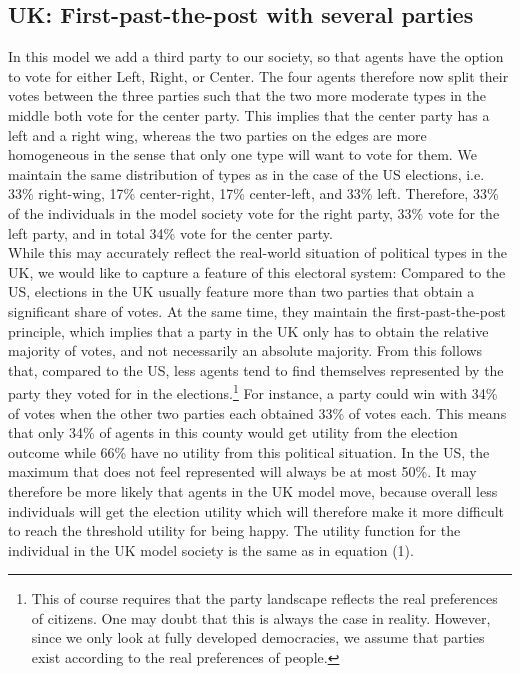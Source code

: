 \documentclass[12pt, a4paper]{article}
\begin{document}
	\subsection{UK: First-past-the-post with several parties}
	In this model we add a third party to our society, so that agents have the option to vote for either Left, Right, or Center. The four agents therefore now split their votes between the three parties such that the two more moderate types in the middle both vote for the center party. This implies that the center party has a left and a right wing, whereas the two parties on the edges are more homogeneous in the sense that only one type will want to vote for them. We maintain the same distribution of types as in the case of the US elections, i.e. 33\% right-wing, 17\% center-right, 17\% center-left, and 33\% left. Therefore, 33\% of the individuals in the model society vote for the right party, 33\% vote for the left party, and in total 34\% vote for the center party. \\
	While this may accurately reflect the real-world situation of political types in the UK, we would like to capture a feature of this electoral system: Compared to the US, elections in the UK usually feature more than two parties that obtain a significant share of votes. At the same time, they maintain the first-past-the-post principle, which implies that a party in the UK only has to obtain the relative majority of votes, and not necessarily an absolute majority. From this follows that, compared to the US, less agents tend to find themselves represented by the party they voted for in the elections.\footnote{This of course requires that the party landscape reflects the real preferences of citizens. One may doubt that this is always the case in reality. However, since we only look at fully developed democracies, we assume that parties exist according to the real preferences of people.} For instance, a party could win with 34\% of votes when the other two parties each obtained 33\% of votes each. This means that only 34\% of agents in this county would get utility from the election outcome while 66\% have no utility from this political situation. In the US, the maximum that does not feel represented will always be at most 50\%. It may therefore be more likely that agents in the UK model move, because overall less individuals will get the election utility which will therefore make it more difficult to reach the threshold utility for being happy.
	The utility function for the individual in the UK model society is the same as in equation (1).
	
\end{document}
